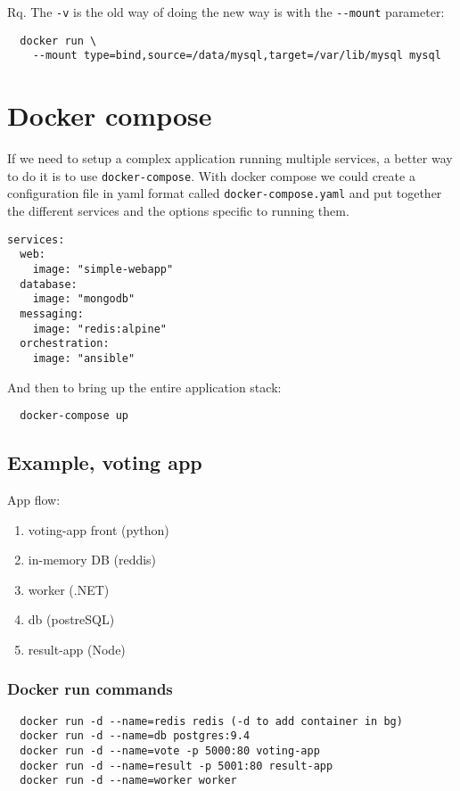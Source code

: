 \documentclass[french]{article}
\begin{document}
Rq. The \verb|-v| is the old way of doing the new way is with the \verb|--mount| parameter:
\begin{verbatim}
  docker run \
    --mount type=bind,source=/data/mysql,target=/var/lib/mysql mysql
\end{verbatim}

\section{Docker compose}

If we need to setup a complex application running multiple services, a better way to do it is to use \verb|docker-compose|. With docker compose we could create a configuration file in yaml format called \verb|docker-compose.yaml| and put together the different services and the options specific to running them.
\begin{verbatim}
services:
  web:
    image: "simple-webapp"
  database:
    image: "mongodb"
  messaging:
    image: "redis:alpine"
  orchestration:
    image: "ansible"
\end{verbatim}

And then to bring up the entire application stack:
\begin{verbatim}
  docker-compose up
\end{verbatim}

\subsection{Example, voting app}

App flow:
\begin{enumerate}
  \item voting-app front (python)
  \item in-memory DB (reddis)
  \item worker (.NET)
  \item db (postreSQL)
  \item result-app (Node)
\end{enumerate}

\subsubsection{Docker run commands}
\begin{verbatim}
  docker run -d --name=redis redis (-d to add container in bg)
  docker run -d --name=db postgres:9.4
  docker run -d --name=vote -p 5000:80 voting-app
  docker run -d --name=result -p 5001:80 result-app
  docker run -d --name=worker worker
\end{verbatim}
\end{document}
